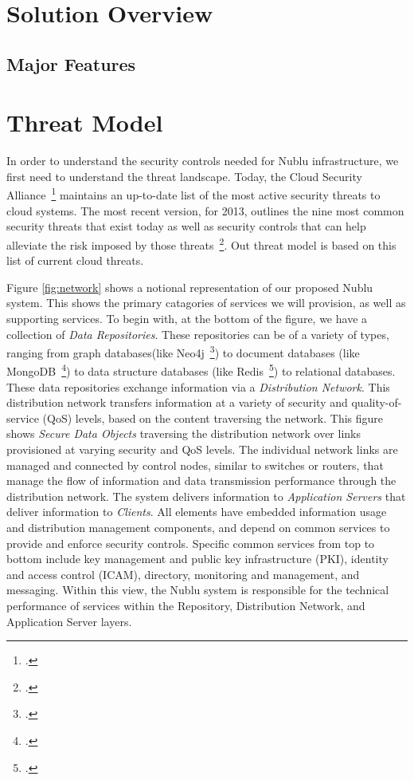 \documentclass[10pt,letterpaper]{article}
\begin{document}
\section{Solution Overview}
\label{sec:overview}

\subsection{Major Features}
\label{sec:features}

\section{Threat Model}
\label{sec:threat-model}
In order to understand the security controls needed for Nublu infrastructure, we first need to understand the threat landscape.  Today, the Cloud Security Alliance~\footcite{csa} maintains an up-to-date list of the most active security threats to cloud systems.  The most recent version, for 2013, outlines the nine most common security threats that exist today as well as security controls that can help alleviate the risk imposed by those threats~\footcite{csa-noni:13}.  Out threat model is based on this list of current cloud threats.


Figure \ref{fig:network} shows a notional representation of our proposed Nublu system.  This shows the primary catagories of services we will provision, as well as supporting services.  To begin with, at the bottom of the figure, we have a collection of {\sl Data Repositories}.  These repositories can be of a variety of types, ranging from graph databases(like Neo4j~\footcite{neo4j}) to document databases (like MongoDB~\footcite{mongodb}) to data structure databases (like Redis~\footcite{redis}) to relational databases. These data repositories exchange information via a {\sl Distribution Network}.  This distribution network transfers information at a variety of security and quality-of-service (QoS) levels, based on the content traversing the network.  This figure shows {\sl Secure Data Objects} traversing the distribution network over links provisioned at varying security and QoS levels.  The individual network links are managed and connected by control nodes, similar to switches or routers, that manage the flow of information and data transmission performance through the distribution network.  The system delivers information to {\sl Application Servers} that deliver information to {\sl Clients}.  All elements have embedded information usage and distribution management components, and depend on common services to provide and enforce security controls.  Specific common services from top to bottom include key management and public key infrastructure (PKI), identity and access control (ICAM), directory, monitoring and management, and messaging.  Within this view, the Nublu system is responsible for the technical performance of services within the Repository, Distribution Network, and Application Server layers.
\end{document}
